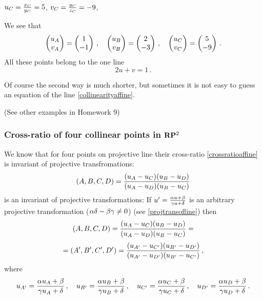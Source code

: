 \documentclass[12pt]{article}
\numberwithin{equation}{section}
\begin{document}
     $u_C={x_C\over y_C}=5$, $v_C={y_C\over z_C}=-9$,
 
We see that
              \begin{equation}\label{exercisethreepointsontheline}
\begin{pmatrix}
       u_A\cr  v_A\cr
\end{pmatrix}
   =
\begin{pmatrix}
       1\cr -1\cr
\end{pmatrix}
 \,,\quad
 \begin{pmatrix}
       u_B\cr  v_B\cr
\end{pmatrix}
   =
\begin{pmatrix}
       2\cr -3\cr
\end{pmatrix}
 \,,\quad
 \begin{pmatrix}
       u_C\cr  v_C\cr
\end{pmatrix}
   =
\begin{pmatrix}
       5\cr -9\cr
\end{pmatrix}
 \,.
              \end{equation}
 All these points belong  to the one line
         $$
    2u+v=1\,.
         $$

Of course the second way is much shorter, but sometimes
it is not easy to guess an equation of the line \eqref{collinearityaffine}.

(See other examples in Homework 9)
 

\subsubsection {Cross-ratio of four 
collinear points in ${\bf R}{\bf P}^2$}

We know that for four points on projective line their cross-ratio
\eqref{crossratioaffine} is invariant of projective transfromations:
               \begin{equation}\label{crossratiohere}
   (A,B,C,D)={(u_A-u_C)(u_B-u_D)\over (u_A-u_D)(u_B-u_C)}
               \end{equation}
is an invariant of projective transformations:
If  $u'= {\alpha u+\beta\over \gamma u+\delta}$
is an arbitrary projective transformation
($\alpha\delta-\beta\gamma\not=0$) (see \eqref{projtransofline})
then
             $$
(A,B,C,D)={(u_A-u_C)(u_B-u_D)\over (u_A-u_D)(u_B-u_C)}=
             $$
          \begin{equation}\label{invarianceagain}
=(A',B',C',D')={(u_{A'}-u_{C'})(u_{B'}-u_{D'})
\over (u_{A'}-u_{D'})(u_{B'}-u_{C'})}\,,
          \end{equation}
where
        $$
u_{A'}={\alpha u_A+\beta \over \gamma u_A +\delta}\,,\quad
u_{B'}={\alpha u_B+\beta \over \gamma u_B +\delta}\,,\quad
u_{C'}={\alpha u_C+\beta \over \gamma u_C +\delta}\,,\quad
u_{D'}={\alpha u_D+\beta \over \gamma u_D +\delta}\,.
        $$
\end{document}
